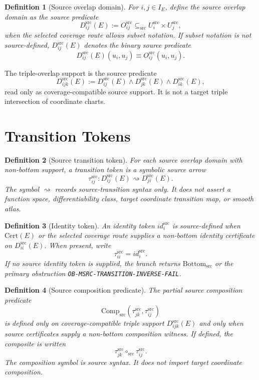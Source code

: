 \documentclass[11pt]{article}
\newcommand{\Bottomsrc}{\mathrm{Bottom}_{\mathrm{src}}}
\newtheorem{definition}{Definition}
\begin{document}
\begin{definition}[Source overlap domain]
For \(i,j\in I_E\), define the source overlap domain as the source predicate
\[
  D_{ij}^{\mathrm{src}}(E)
  :=
  O_{ij}^{\mathrm{src}}
  \subseteq_{\mathrm{src}}
  U_i^{\mathrm{src}}\times U_j^{\mathrm{src}},
\]
when the selected coverage route allows subset notation. If subset notation
is not source-defined, \(D_{ij}^{\mathrm{src}}(E)\) denotes the binary source
predicate
\[
  D_{ij}^{\mathrm{src}}(E)(u_i,u_j)
  \equiv
  O_{ij}^{\mathrm{src}}(u_i,u_j).
\]
\end{definition}

The triple-overlap support is the source predicate
\[
  D_{ijk}^{\mathrm{src}}(E)
  :=
  D_{ij}^{\mathrm{src}}(E)
  \wedge D_{jk}^{\mathrm{src}}(E)
  \wedge D_{ik}^{\mathrm{src}}(E),
\]
read only as coverage-compatible source support. It is not a target triple
intersection of coordinate charts.

\section{Transition Tokens}

\begin{definition}[Source transition token]
For each source overlap domain with non-bottom support, a transition token is
a symbolic source arrow
\[
  \tau_{ij}^{\mathrm{src}}:
  D_{ij}^{\mathrm{src}}(E)\rightsquigarrow D_{ji}^{\mathrm{src}}(E).
\]
The symbol \(\rightsquigarrow\) records source-transition syntax only. It
does not assert a function space, differentiability class, target coordinate
transition map, or smooth atlas.
\end{definition}

\begin{definition}[Identity token]
An identity token \(id_i^{\mathrm{src}}\) is source-defined when
\(\mathrm{Cert}(E)\) or the selected coverage route supplies a non-bottom
identity certificate on \(D_{ii}^{\mathrm{src}}(E)\). When present, write
\[
  \tau_{ii}^{\mathrm{src}} = id_i^{\mathrm{src}}.
\]
If no source identity token is supplied, the branch returns \(\Bottomsrc\) or
the primary obstruction \texttt{OB-MSRC-TRANSITION-INVERSE-FAIL}.
\end{definition}

\begin{definition}[Source composition predicate]
The partial source composition predicate
\[
  \mathrm{Comp}_{\mathrm{src}}
  \left(\tau_{jk}^{\mathrm{src}},\tau_{ij}^{\mathrm{src}}\right)
\]
is defined only on coverage-compatible triple support
\(D_{ijk}^{\mathrm{src}}(E)\) and only when source certificates supply a
non-bottom composition witness. If defined, the composite is written
\[
  \tau_{jk}^{\mathrm{src}}\circ_{\mathrm{src}}\tau_{ij}^{\mathrm{src}}.
\]
The composition symbol is source syntax. It does not import target coordinate
composition.
\end{definition}
\end{document}
